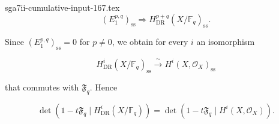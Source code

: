 \begin{filecontents*}{sga7ii-cumulative-input-167.tex}
\begin{equation}\tag{3.3.3}
(E_1^{p,q})_{\mathrm{ss}}
\Longrightarrow H^{p+q}_{\mathrm{DR}}(X/\mathbb F_q)_{\mathrm{ss}}.
\end{equation}

Since $(E_1^{p,q})_{\mathrm{ss}}=0$ for $p\ne0$, we obtain for every $i$ an
isomorphism

\begin{equation}\tag{3.3.4}
H^i_{\mathrm{DR}}(X/\mathbb F_q)_{\mathrm{ss}}
\xrightarrow{\ \sim\ }
H^i(X,\mathcal O_X)_{\mathrm{ss}}
\end{equation}

that commutes with $\mathfrak F_q$. Hence

\begin{equation}\tag{3.3.5}
\det\!\left(1-t\mathfrak F_q\mid H^i_{\mathrm{DR}}(X/\mathbb F_q)\right)
=
\det\!\left(1-t\mathfrak F_q\mid H^i(X,\mathcal O_X)\right).
\end{equation}
\end{filecontents*}
